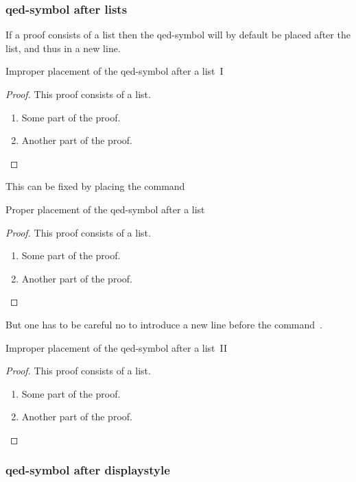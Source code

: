 \subsubsection{qed-symbol after lists}

If a proof consists of a list then the qed-symbol will by default be placed after the list, and thus in a new line.
\begin{showlatex}{Improper placement of the qed-symbol after a list~I}
\begin{proof}
  This proof consists of a list.
  \begin{enumerate}
    \item
      Some part of the proof.
    \item
      Another part of the proof.
  \end{enumerate}
\end{proof}
\end{showlatex}
This can be fixed by placing the command~
\begin{showlatex}{Proper placement of the qed-symbol after a list}
\begin{proof}
  This proof consists of a list.
  \begin{enumerate}
    \item
      Some part of the proof.
    \item
      Another part of the proof.
    \qedhere
  \end{enumerate}
\end{proof}
\end{showlatex}
But one has to be careful no to introduce a new line before the command~.
\begin{showlatex}{Improper placement of the qed-symbol after a list~II}
\begin{proof}
  This proof consists of a list.
  \begin{enumerate}
    \item
      Some part of the proof.
    \item
      Another part of the proof.
      
    \qedhere
  \end{enumerate}
\end{proof}
\end{showlatex}

\subsubsection{qed-symbol after displaystyle}

